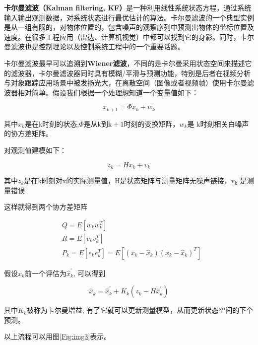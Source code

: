 \textbf{卡尔曼滤波（Kalman filtering, KF）}是一种利用线性系统状态方程，通过系统输入输出观测数据，对系统状态进行最优估计的算法\cite{ArtE3}。卡尔曼滤波的一个典型实例是从一组有限的，对物体位置的，包含噪声的观察序列中预测出物体的坐标位置及速度。在很多工程应用（雷达、计算机视觉）中都可以找到它的身影。同时，卡尔曼滤波也是控制理论以及控制系统工程中的一个重要话题。

卡尔曼滤波最早可以追溯到\textbf{Wiener滤波}，不同的是卡尔曼采用状态空间来描述它的滤波器，卡尔曼滤波器同时具有模糊/平滑与预测功能，特别是后者在视频分析与对象跟踪应用场景中被发扬光大，在离散空间（图像或者视频帧）使用卡尔曼滤波器相对简单。假设我们根据一个处理想知道一个变量值如下：

\begin{equation}
x_{k+1}=\Phi x_{k}+w_{k}
\end{equation}

其中$x_{k}$是在$\mathrm{k}$时刻的状态,$\Phi$是从$\mathrm{k}$到$\mathrm{k}+1$时刻的变换矩阵，$w_{k}$是 $\mathrm{k}$时刻相关白噪声的协方差矩阵。

对观测值建模如下：

\begin{equation}
z_{k}=H x_{k}+v_{k}
\end{equation}

其中$z_{k}$是在k时刻对x的实际测量值，$\mathrm{H}$是状态矩阵与测量矩阵无噪声链接，$\mathrm{v}_{\mathrm{k}}$ 是测量错误

这样就得到两个协方差矩阵

\begin{equation}
\begin{aligned}
&Q=E\left[w_{k} w_{k}^{T}\right] \\
&R=E\left[v_{k} v_{k}^{T}\right] \\
&P_{k}=E\left[e_{k} e_{k}^{T}\right]=E\left[\left(x_{k}-\hat{x}_{k}\right)\left(x_{k}-\hat{x}_{k}\right)^{T}\right]
\end{aligned}
\end{equation}

假设$\hat{x}_{k}$前一个评估为$\hat{x}_{k}^{\prime}$, 可以得到

\begin{equation}
\hat{x}_{k}=\hat{x}_{k}^{\prime}+K_{k}\left(z_{k}-H \hat{x}_{k}^{\prime}\right)
\end{equation}

其中$K_{k}$被称为卡尔曼增益, 有了它就可以更新测量模型，从而更新状态空间的下个预测。

以上流程可以用图\ref{Fig:img3}表示。

